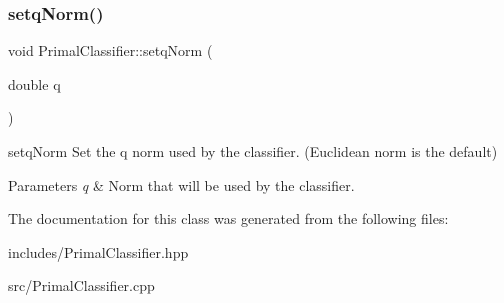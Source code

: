 \subsubsection{\texorpdfstring{setq\+Norm()}{setqNorm()}}
{\footnotesize\ttfamily void Primal\+Classifier\+::setq\+Norm (\begin{DoxyParamCaption}\item[{double}]{q }\end{DoxyParamCaption})}



setq\+Norm Set the q norm used by the classifier. (Euclidean norm is the default) 


\begin{DoxyParams}{Parameters}
{\em q} & Norm that will be used by the classifier. \\
\hline
\end{DoxyParams}


The documentation for this class was generated from the following files\+:\begin{DoxyCompactItemize}
\item 
includes/Primal\+Classifier.\+hpp\item 
src/Primal\+Classifier.\+cpp\end{DoxyCompactItemize}
